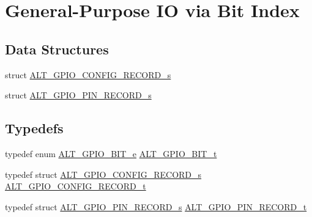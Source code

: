 \hypertarget{group__ALT__GPIO__BITVIEW}{}\section{General-\/\+Purpose IO via Bit Index}
\label{group__ALT__GPIO__BITVIEW}
\subsection*{Data Structures}
\begin{DoxyCompactItemize}
\item 
struct \mbox{\hyperlink{structALT__GPIO__CONFIG__RECORD__s}{A\+L\+T\+\_\+\+G\+P\+I\+O\+\_\+\+C\+O\+N\+F\+I\+G\+\_\+\+R\+E\+C\+O\+R\+D\+\_\+s}}
\item 
struct \mbox{\hyperlink{structALT__GPIO__PIN__RECORD__s}{A\+L\+T\+\_\+\+G\+P\+I\+O\+\_\+\+P\+I\+N\+\_\+\+R\+E\+C\+O\+R\+D\+\_\+s}}
\end{DoxyCompactItemize}
\subsection*{Typedefs}
\begin{DoxyCompactItemize}
\item 
typedef enum \mbox{\hyperlink{group__ALT__GPIO__BITVIEW_ga59d65695b346291e584e1a3590520802}{A\+L\+T\+\_\+\+G\+P\+I\+O\+\_\+B\+I\+T\+\_\+e}} \mbox{\hyperlink{group__ALT__GPIO__BITVIEW_ga6d149a5961bef8b91b8108e3838b1e09}{A\+L\+T\+\_\+\+G\+P\+I\+O\+\_\+B\+I\+T\+\_\+t}}
\item 
typedef struct \mbox{\hyperlink{structALT__GPIO__CONFIG__RECORD__s}{A\+L\+T\+\_\+\+G\+P\+I\+O\+\_\+\+C\+O\+N\+F\+I\+G\+\_\+\+R\+E\+C\+O\+R\+D\+\_\+s}} \mbox{\hyperlink{group__ALT__GPIO__BITVIEW_ga4f9ae2a8f2479be9005d07d74e1c91fd}{A\+L\+T\+\_\+\+G\+P\+I\+O\+\_\+\+C\+O\+N\+F\+I\+G\+\_\+\+R\+E\+C\+O\+R\+D\+\_\+t}}
\item 
typedef struct \mbox{\hyperlink{structALT__GPIO__PIN__RECORD__s}{A\+L\+T\+\_\+\+G\+P\+I\+O\+\_\+\+P\+I\+N\+\_\+\+R\+E\+C\+O\+R\+D\+\_\+s}} \mbox{\hyperlink{group__ALT__GPIO__BITVIEW_gac0bf685afaa6d2543dc9a1569e663ef7}{A\+L\+T\+\_\+\+G\+P\+I\+O\+\_\+\+P\+I\+N\+\_\+\+R\+E\+C\+O\+R\+D\+\_\+t}}
\end{DoxyCompactItemize}
